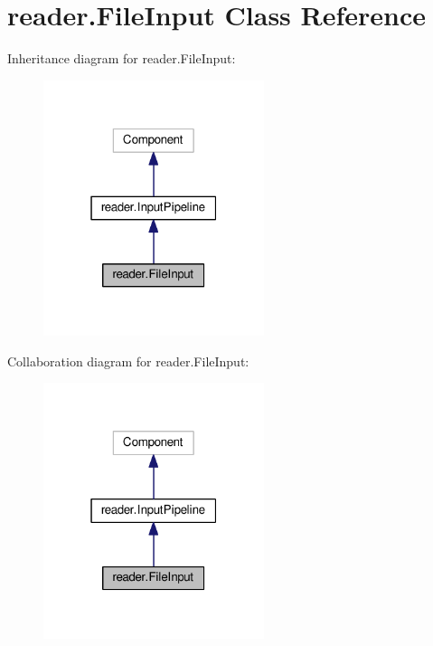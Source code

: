 \hypertarget{classreader_1_1FileInput}{}\section{reader.\+File\+Input Class Reference}
\label{classreader_1_1FileInput}


Inheritance diagram for reader.\+File\+Input\+:
\nopagebreak
\begin{figure}[H]
\begin{center}
\leavevmode
\includegraphics[width=183pt]{classreader_1_1FileInput__inherit__graph}
\end{center}
\end{figure}


Collaboration diagram for reader.\+File\+Input\+:
\nopagebreak
\begin{figure}[H]
\begin{center}
\leavevmode
\includegraphics[width=183pt]{classreader_1_1FileInput__coll__graph}
\end{center}
\end{figure}
